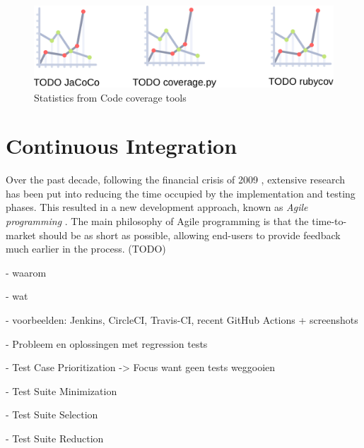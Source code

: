 \begin{figure}[htbp!]
	\centering
	\includegraphics[width=\textwidth]{assets/coverage.pdf}
	\caption{Statistics from Code coverage tools}
	\label{fig:coverage-statistics}
\end{figure}

\section{Continuous Integration}

Over the past decade, following the financial crisis of 2009 \cite{ionel2009}, extensive research has been put into reducing the time occupied by the implementation and testing phases. This resulted in a new development approach, known as \emph{Agile programming} \cite{torgeir2010}. The main philosophy of Agile programming is that the time-to-market should be as short as possible, allowing end-users to provide feedback much earlier in the process. (TODO)

- waarom

- wat

- voorbeelden: Jenkins, CircleCI, Travis-CI, recent GitHub Actions + screenshots

- Probleem en oplossingen met regression tests

  - Test Case Prioritization -> Focus want geen tests weggooien
  
  - Test Suite Minimization
  
  - Test Suite Selection
  
  - Test Suite Reduction

